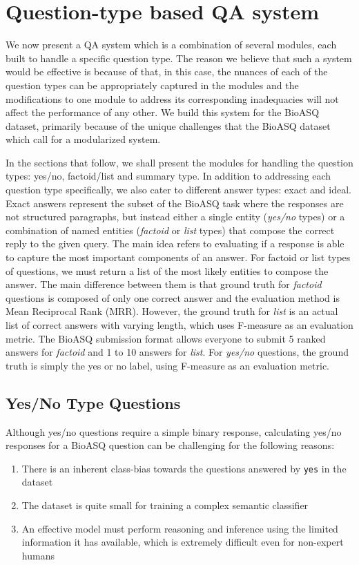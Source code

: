 \section{Question-type based QA system} \label{approach2}

We now present a QA system which is a combination of several modules, each built to handle a specific question type. The reason we believe that such a system would be effective is because of that, in this case, the nuances of each of the question types can be appropriately captured in the modules and the modifications to one module to address its corresponding inadequacies will not affect the performance of any other. 
We build this system for the BioASQ dataset, primarily because of the unique challenges that the BioASQ dataset which call for a modularized system. 

In the sections that follow, we shall present the modules for handling the question types: yes/no, factoid/list and summary type. In addition to addressing each question type specifically, we also cater to different answer types: exact and ideal. Exact answers represent the subset of the BioASQ task where the responses are not structured paragraphs, but instead either a single entity (\textit{yes/no} types) or a combination of named entities (\textit{factoid} or \textit{list} types) that compose the correct reply to the given query. The main idea refers to evaluating if a response is able to capture the most important components of an answer. For factoid or list types of questions, we must return a list of the most likely entities to compose the answer. The main difference between them is that ground truth for \textit{factoid} questions is composed of only one correct answer and the evaluation method is Mean Reciprocal Rank (MRR). However, the ground truth for \textit{list} is an actual list of correct answers with varying length, which uses F-measure as an evaluation metric. The BioASQ submission format allows everyone to submit 5 ranked answers for \textit{factoid} and 1 to 10 answers for \textit{list}. For \textit{yes/no} questions, the ground truth is simply the yes or no label, using F-measure as an evaluation metric.

\subsection{Yes/No Type Questions}


Although yes/no questions require a simple binary response, calculating yes/no responses for a BioASQ question can be challenging for the following reasons: 
\begin{enumerate}
    \item There is an inherent class-bias towards the questions answered by \texttt{yes} in the dataset
    \item The dataset is quite small for training a complex semantic classifier
    \item An effective model must perform  reasoning and inference using the limited information it has available, which is extremely difficult even for non-expert humans
\end{enumerate}


